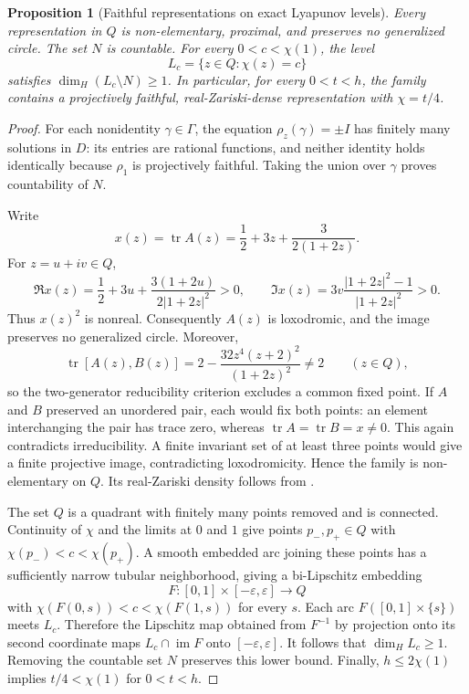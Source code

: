 \documentclass[11pt,letterpaper]{amsart}
\newtheorem{proposition}[theorem]{Proposition}
\theoremstyle{definition}
\theoremstyle{remark}
\numberwithin{equation}{section}
\begin{document}
\begin{proposition}[Faithful representations on exact Lyapunov levels]
\label{prop:exact-levels}
Every representation in $Q$ is non-elementary, proximal, and preserves
no generalized circle. The set $N$ is countable. For every
$0<c<\chi(1)$, the level
\[
 L_c=\{z\in Q:\chi(z)=c\}
\]
satisfies $\dim_H(L_c\setminus N)\ge1$. In particular, for every
$0<t<h$, the family contains a projectively faithful, real-Zariski-dense
representation with $\chi=t/4$.
\end{proposition}
\begin{proof}
For each nonidentity $\gamma\in\Gamma$, the equation
$\rho_z(\gamma)=\pm I$ has finitely many solutions in $D$:
its entries are rational functions, and neither identity holds
identically because $\rho_1$ is projectively faithful. Taking the
union over $\gamma$ proves countability of $N$.

Write
\[
 x(z)=\operatorname{tr}A(z)
 =\frac12+3z+\frac{3}{2(1+2z)}.
\]
For $z=u+iv\in Q$,
\[
 \Re x(z)=\frac12+3u+
 \frac{3(1+2u)}{2|1+2z|^2}>0,
 \qquad
 \Im x(z)=3v\frac{|1+2z|^2-1}{|1+2z|^2}>0.
\]
Thus $x(z)^2$ is nonreal. Consequently $A(z)$ is loxodromic,
and the image preserves no generalized circle. Moreover,
\[
 \operatorname{tr}[A(z),B(z)]
 =2-\frac{32z^4(z+2)^2}{(1+2z)^2}\ne2
 \qquad(z\in Q),
\]
so the two-generator reducibility criterion excludes a common fixed
point. If $A$ and $B$ preserved an unordered pair, each would fix
both points: an element interchanging the pair has trace zero,
whereas $\operatorname{tr}A=\operatorname{tr}B=x\ne0$.
This again contradicts irreducibility. A finite invariant set of at
least three points would give a finite projective image, contradicting
loxodromicity. Hence the family is non-elementary on $Q$.
Its real-Zariski density follows from \cite[Lemma~2.11]{RR}.

The set $Q$ is a quadrant with finitely many points removed and is
connected. Continuity of $\chi$ and the limits at $0$ and $1$ give
points $p_-,p_+\in Q$ with $\chi(p_-)<c<\chi(p_+)$.
A smooth embedded arc joining these points has a sufficiently narrow
tubular neighborhood, giving a bi-Lipschitz embedding
\[
 F:[0,1]\times[-\varepsilon,\varepsilon]\longrightarrow Q
\]
with $\chi(F(0,s))<c<\chi(F(1,s))$ for every $s$.
Each arc $F([0,1]\times\{s\})$ meets $L_c$. Therefore the
Lipschitz map obtained from $F^{-1}$ by projection onto its second
coordinate maps $L_c\cap\operatorname{im}F$ onto
$[-\varepsilon,\varepsilon]$. It follows that $\dim_H L_c\ge1$.
Removing the countable set $N$ preserves this lower bound.
Finally, $h\le2\chi(1)$ implies $t/4<\chi(1)$ for $0<t<h$.
\end{proof}
\end{document}
